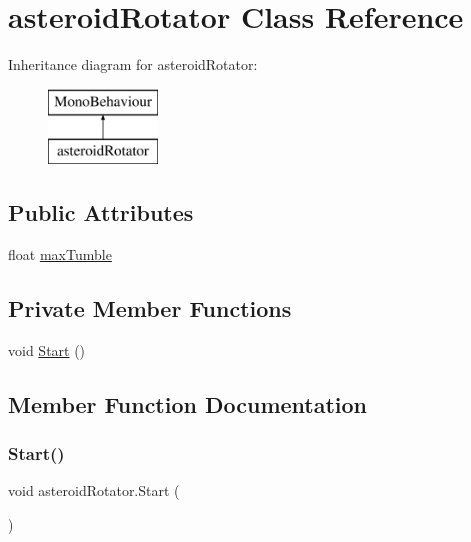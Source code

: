 \hypertarget{classasteroid_rotator}{}\section{asteroid\+Rotator Class Reference}
\label{classasteroid_rotator}
Inheritance diagram for asteroid\+Rotator\+:\begin{figure}[H]
\begin{center}
\leavevmode
\includegraphics[height=2.000000cm]{classasteroid_rotator}
\end{center}
\end{figure}
\subsection*{Public Attributes}
\begin{DoxyCompactItemize}
\item 
float \mbox{\hyperlink{classasteroid_rotator_aa56366ba6b72b12f75b7dfaefc7fe7d6}{max\+Tumble}}
\end{DoxyCompactItemize}
\subsection*{Private Member Functions}
\begin{DoxyCompactItemize}
\item 
void \mbox{\hyperlink{classasteroid_rotator_a13e2d5d3e11fb68dc9b35f0e99c597c7}{Start}} ()
\end{DoxyCompactItemize}


\subsection{Member Function Documentation}
\mbox{\label{classasteroid_rotator_a13e2d5d3e11fb68dc9b35f0e99c597c7}} 
\subsubsection{\texorpdfstring{Start()}{Start()}}
{\footnotesize\ttfamily void asteroid\+Rotator.\+Start (\begin{DoxyParamCaption}{ }\end{DoxyParamCaption})\hspace{0.3cm}{\ttfamily [private]}}



